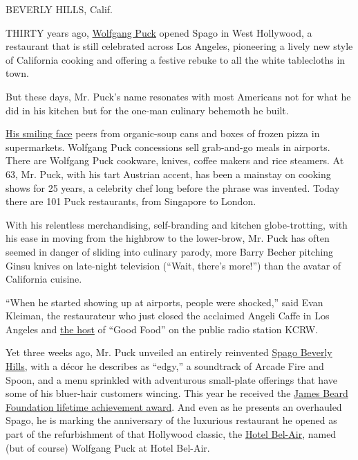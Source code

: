 BEVERLY HILLS, Calif.

THIRTY years ago,
\href{http://topics.nytimes.com/top/reference/timestopics/people/p/wolfgang_puck/index.html?8qa}{Wolfgang
Puck} opened Spago in West Hollywood, a restaurant that is still
celebrated across Los Angeles, pioneering a lively new style of
California cooking and offering a festive rebuke to all the white
tablecloths in town.

But these days, Mr. Puck's name resonates with most Americans not for
what he did in his kitchen but for the one-man culinary behemoth he
built.

\href{http://www.wolfgangpuck.com/}{His smiling face} peers from
organic-soup cans and boxes of frozen pizza in supermarkets. Wolfgang
Puck concessions sell grab-and-go meals in airports. There are Wolfgang
Puck cookware, knives, coffee makers and rice steamers. At 63, Mr. Puck,
with his tart Austrian accent, has been a mainstay on cooking shows for
25 years, a celebrity chef long before the phrase was invented. Today
there are 101 Puck restaurants, from Singapore to London.

With his relentless merchandising, self-branding and kitchen
globe-trotting, with his ease in moving from the highbrow to the
lower-brow, Mr. Puck has often seemed in danger of sliding into culinary
parody, more Barry Becher pitching Ginsu knives on late-night television
(``Wait, there's more!'') than the avatar of California cuisine.

``When he started showing up at airports, people were shocked,'' said
Evan Kleiman, the restaurateur who just closed the acclaimed Angeli
Caffe in Los Angeles and
\href{http://www.kcrw.com/people/kleiman_evan?role=host}{the host} of
``Good Food'' on the public radio station KCRW.

Yet three weeks ago, Mr. Puck unveiled an entirely reinvented
\href{http://www.wolfgangpuck.com/restaurants/fine-dining/3635}{Spago
Beverly Hills}, with a décor he describes as ``edgy,'' a soundtrack of
Arcade Fire and Spoon, and a menu sprinkled with adventurous small-plate
offerings that have some of his bluer-hair customers wincing. This year
he received the
\href{http://www.jamesbeard.org/awards/lifetime-achievement}{James Beard
Foundation lifetime achievement award}. And even as he presents an
overhauled Spago, he is marking the anniversary of the luxurious
restaurant he opened as part of the refurbishment of that Hollywood
classic, the \href{http://www.hotelbelair.com/}{Hotel Bel-Air}, named
(but of course) Wolfgang Puck at Hotel Bel-Air.

